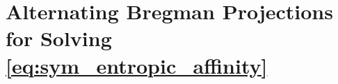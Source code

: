 \section{Alternating Bregman Projections for Solving \eqref{eq:sym_entropic_affinity}}\label{sec:dykstra}






